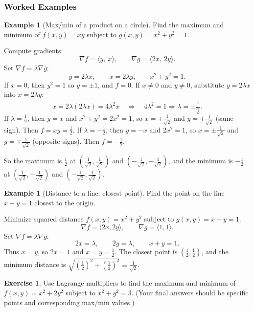 \documentclass[12pt]{article}
\numberwithin{equation}{section}
\theoremstyle{plain}
\theoremstyle{definition}
\newtheorem{example}[theorem]{Example}
\newtheorem{exercise}[theorem]{Exercise}
\theoremstyle{remark}
\begin{document}
\subsubsection{Worked Examples}

\begin{example}[Max/min of a product on a circle]
Find the maximum and minimum of $f(x,y)=xy$ subject to $g(x,y)=x^2+y^2=1$.

Compute gradients:
\[
\nabla f=\langle y,\ x\rangle,\qquad \nabla g=\langle 2x,\ 2y\rangle.
\]
Set $\nabla f=\lambda \nabla g$:
\[
y=2\lambda x,\qquad x=2\lambda y,\qquad x^2+y^2=1.
\]
If $x=0$, then $y^2=1$ so $y=\pm 1$, and $f=0$.
If $x\neq 0$ and $y\neq 0$, substitute $y=2\lambda x$ into $x=2\lambda y$:
\[
x=2\lambda(2\lambda x)=4\lambda^2 x \quad\Rightarrow\quad 4\lambda^2=1 \Rightarrow \lambda=\pm\frac12.
\]
If $\lambda=\tfrac12$, then $y=x$ and $x^2+y^2=2x^2=1$, so $x=\pm\frac{1}{\sqrt2}$ and $y=\pm\frac{1}{\sqrt2}$ (same sign). Then $f=xy=\frac12$.
If $\lambda=-\tfrac12$, then $y=-x$ and $2x^2=1$, so $x=\pm\frac{1}{\sqrt2}$ and $y=\mp\frac{1}{\sqrt2}$ (opposite signs). Then $f=-\frac12$.

So the maximum is $\frac12$ at $\left(\frac{1}{\sqrt2},\frac{1}{\sqrt2}\right)$ and $\left(-\frac{1}{\sqrt2},-\frac{1}{\sqrt2}\right)$,
and the minimum is $-\frac12$ at $\left(\frac{1}{\sqrt2},-\frac{1}{\sqrt2}\right)$ and $\left(-\frac{1}{\sqrt2},\frac{1}{\sqrt2}\right)$.
\end{example}

\begin{example}[Distance to a line: closest point]
Find the point on the line $x+y=1$ closest to the origin.

Minimize squared distance $f(x,y)=x^2+y^2$ subject to $g(x,y)=x+y=1$.
\[
\nabla f=\langle 2x,2y\rangle,\qquad \nabla g=\langle 1,1\rangle.
\]
Set $\nabla f=\lambda \nabla g$:
\[
2x=\lambda,\qquad 2y=\lambda,\qquad x+y=1.
\]
Thus $x=y$, so $2x=1$ and $x=y=\frac12$.
The closest point is $\left(\frac12,\frac12\right)$, and the minimum distance is $\sqrt{\left(\frac12\right)^2+\left(\frac12\right)^2}=\frac{1}{\sqrt2}$.
\end{example}

\begin{exercise}
Use Lagrange multipliers to find the maximum and minimum of $f(x,y)=x^2+2y^2$ subject to $x^2+y^2=3$.  
(Your final answers should be specific points and corresponding max/min values.)
\end{exercise}
\end{document}
